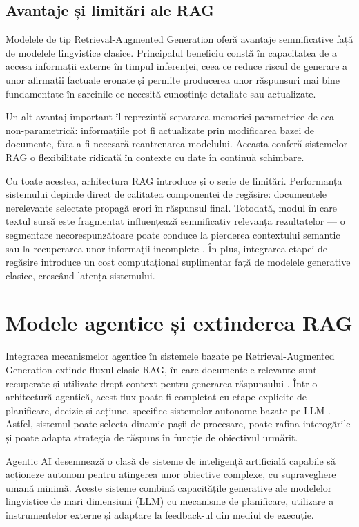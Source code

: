 \documentclass[12pt, a4paper, oneside, romanian]{teza-upb}
\begin{document}
\subsection{Avantaje și limitări ale RAG}

Modelele de tip Retrieval-Augmented Generation oferă avantaje semnificative față de
modelele lingvistice clasice. Principalul beneficiu constă în capacitatea de a accesa
informații externe în timpul inferenței, ceea ce reduce riscul de generare a unor
afirmații factuale eronate și permite producerea unor răspunsuri mai bine fundamentate
în sarcinile ce necesită cunoștințe detaliate sau actualizate.

Un alt avantaj important îl reprezintă separarea memoriei parametrice de cea
non-parametrică: informațiile pot fi actualizate prin modificarea bazei de documente,
fără a fi necesară reantrenarea modelului. Aceasta conferă sistemelor RAG o
flexibilitate ridicată în contexte cu date în continuă schimbare. \cite{lewis2020retrieval}

Cu toate acestea, arhitectura RAG introduce și o serie de limitări. Performanța
sistemului depinde direct de calitatea componentei de regăsire: documentele
nerelevante selectate propagă erori în răspunsul final. Totodată, modul în care
textul sursă este fragmentat influențează semnificativ relevanța rezultatelor —
o segmentare necorespunzătoare poate conduce la pierderea contextului semantic
sau la recuperarea unor informații incomplete \cite{gao2023retrieval}. În plus,
integrarea etapei de regăsire introduce un cost computațional suplimentar față
de modelele generative clasice, crescând latența sistemului.

\section{Modele agentice și extinderea RAG}

Integrarea mecanismelor agentice în sistemele bazate pe Retrieval-Augmented Generation 
extinde fluxul clasic RAG, în care documentele relevante sunt recuperate și utilizate 
drept context pentru generarea răspunsului \cite{lewis2020retrieval}. Într-o arhitectură 
agentică, acest flux poate fi completat cu etape explicite de planificare, decizie și 
acțiune, specifice sistemelor autonome bazate pe LLM \cite{wang2024survey}. Astfel, 
sistemul poate selecta dinamic pașii de procesare, poate rafina interogările și poate 
adapta strategia de răspuns în funcție de obiectivul urmărit.

Agentic AI desemnează o clasă de sisteme de inteligență artificială capabile să acționeze 
autonom pentru atingerea unor obiective complexe, cu supraveghere umană minimă. Aceste 
sisteme combină capacitățile generative ale modelelor lingvistice de mari dimensiuni (LLM) 
cu mecanisme de planificare, utilizare a instrumentelor externe și adaptare la feedback-ul 
din mediul de execuție. \cite{ibm_agentic}
\end{document}
